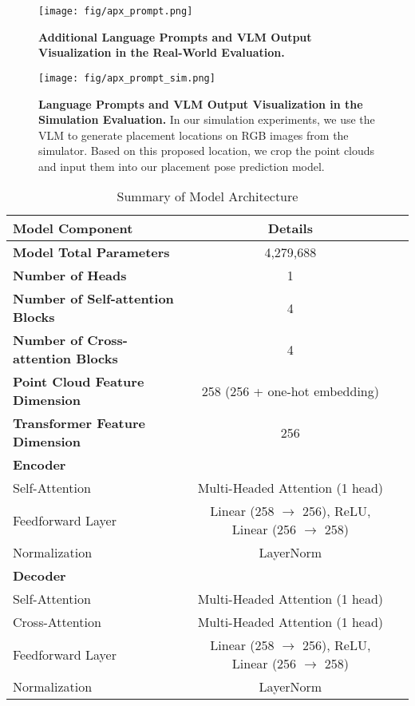 \begin{figure*}[!h]
    \centering
    \texttt{[image: fig/apx\_prompt.png]}
    \caption{\textbf{Additional Language Prompts and VLM Output Visualization in the Real-World Evaluation.} }
    \label{fig:prompt}
\end{figure*}


\begin{figure*}[!h]
    \centering
    \texttt{[image: fig/apx\_prompt\_sim.png]}
    \caption{\textbf{Language Prompts and VLM Output Visualization in the Simulation Evaluation.} In our simulation experiments, we use the VLM to generate placement locations on RGB images from the simulator. Based on this proposed location, we crop the point clouds and input them into our placement pose prediction model.}
    \label{fig:prompt_sim}
\end{figure*}



\begin{table*}[h]
    \centering
    \normalsize
    \caption{Summary of Model Architecture}
    \label{tab:model_arch}
    \begin{tabular}{@{}lcc@{}}
        \toprule
        \textbf{Model Component} & \textbf{Details} \\ 
        \midrule
        \textbf{Model Total Parameters} &  4,279,688 \\ 
        \textbf{Number of Heads} & 1 \\ 
        \textbf{Number of Self-attention Blocks} & 4 \\ 
        \textbf{Number of Cross-attention Blocks} & 4 \\ 
        \textbf{Point Cloud Feature Dimension} & 258 (256 + one-hot embedding) \\ 
        \textbf{Transformer Feature Dimension} & 256 \\ 
        \midrule
        \multicolumn{2}{l}{\textbf{Encoder}} \\ 
        \midrule
        Self-Attention & Multi-Headed Attention (1 head) \\ 
        Feedforward Layer & Linear (258 $\to$ 256), ReLU, Linear (256 $\to$ 258) \\ 
        Normalization & LayerNorm \\ 
        \midrule
        \multicolumn{2}{l}{\textbf{Decoder}} \\ 
        \midrule
        Self-Attention & Multi-Headed Attention (1 head) \\ 
        Cross-Attention & Multi-Headed Attention (1 head) \\ 
        Feedforward Layer & Linear (258 $\to$ 256), ReLU, Linear (256 $\to$ 258) \\ 
        Normalization & LayerNorm \\ 
        \bottomrule
    \end{tabular}
\end{table*}